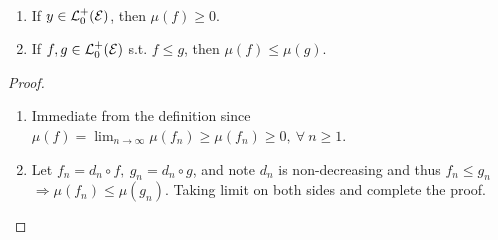 \begin{proposition}\
\begin{enumerate}[label = (\alph*)]
    \item If $y \in \mathcal{L}_0^+(\mathcal{E})$, then $\mu(f) \geq 0$.
    \item If $f,g \in \mathcal{L}_0^+(\mathcal{E})$ s.t. $f \leq g$, then $\mu(f) \leq \mu(g)$.
\end{enumerate}
\end{proposition}
\begin{proof}\
\begin{enumerate}[label = (\alph*)]
    \item Immediate from the definition since $\mu(f) = \lim_{n \to \infty} \mu(f_n) \geq \mu(f_n) \geq 0,\ \forall\ n \geq 1$.
    \item Let $f_n = d_n \circ f,\ g_n = d_n \circ g$, and note $d_n$ is non-decreasing and thus $f_n \leq g_n$ $\Rightarrow \mu(f_n) \leq \mu(g_n)$. Taking limit on both sides and complete the proof.
\end{enumerate}
\end{proof}

